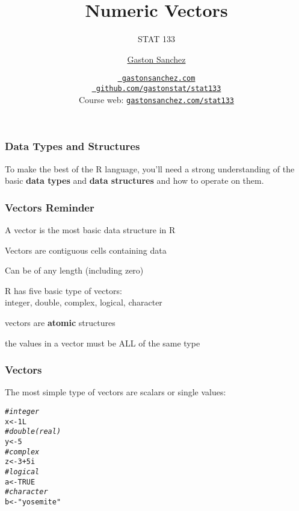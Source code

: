 \documentclass[12pt]{beamer}\usepackage[]{graphicx}\usepackage[]{color}
\title{Numeric Vectors}
\subtitle{STAT 133}
\author{\href{http://www.gastonsanchez.com}{Gaston Sanchez}}
\institute{Department of Statistics, UC{\textendash}Berkeley}
\date{\href{http://www.gastonsanchez.com}{\tt \scriptsize \color{foreground} gastonsanchez.com}
\\[-4pt]
\href{http://github.com/gastonstat/stat133}{\tt \scriptsize \color{foreground} github.com/gastonstat/stat133}
\\[-4pt]
{\scriptsize Course web: \href{http://www.gastonsanchez.com/stat133}{\tt gastonsanchez.com/stat133}}
}
\makeatletter
\newcommand{\hlnum}[1]{\textcolor[rgb]{0.686,0.059,0.569}{#1}}%
\newcommand{\hlstr}[1]{\textcolor[rgb]{0.192,0.494,0.8}{#1}}%
\newcommand{\hlcom}[1]{\textcolor[rgb]{0.678,0.584,0.686}{\textit{#1}}}%
\newcommand{\hlopt}[1]{\textcolor[rgb]{0,0,0}{#1}}%
\newcommand{\hlstd}[1]{\textcolor[rgb]{0.345,0.345,0.345}{#1}}%
\newcommand{\hlkwb}[1]{\textcolor[rgb]{0.69,0.353,0.396}{#1}}%
\newenvironment{kframe}{%
 \def\at@end@of@kframe{}%
 \ifinner\ifhmode%
  \def\at@end@of@kframe{\end{minipage}}%
  \begin{minipage}{\columnwidth}%
 \fi\fi%
 \def\FrameCommand##1{\hskip\@totalleftmargin \hskip-\fboxsep
 \colorbox{shadecolor}{##1}\hskip-\fboxsep
     \hskip-\linewidth \hskip-\@totalleftmargin \hskip\columnwidth}%
 \MakeFramed {\advance\hsize-\width
   \@totalleftmargin\z@ \linewidth\hsize
   \@setminipage}}%
 {\par\unskip\endMakeFramed%
 \at@end@of@kframe}
\newenvironment{knitrout}{}{} %
\makeatother
\begin{document}
{
  \frame{
    \titlepage
  } 
}


\begin{frame}
\frametitle{Data Types and Structures}

To make the best of the R language, you'll need a strong understanding of the basic \textbf{data types} and \textbf{data structures} and how to operate on them.

\end{frame}


\begin{frame}
\begin{center}
\Huge{}
\end{center}
\end{frame}


\begin{frame}
\frametitle{Vectors Reminder}

\bi
  \item A vector is the most basic data structure in R
  \item Vectors are contiguous cells containing data
  \item Can be of any length (including zero)
  \item R has five basic type of vectors: \\
  integer, double, complex, logical, character
  \item vectors are \textbf{atomic} structures
  \item the values in a vector must be ALL of the same type 
\ei

\end{frame}


\begin{frame}[fragile]
\frametitle{Vectors}

The most simple type of vectors are scalars or single values:
\begin{knitrout}\footnotesize
{}\color{fgcolor}\begin{kframe}
\begin{alltt}
\hlcom{# integer}
\hlstd{x} \hlkwb{<-} \hlnum{1L}
\hlcom{# double (real)}
\hlstd{y} \hlkwb{<-} \hlnum{5}
\hlcom{# complex}
\hlstd{z} \hlkwb{<-} \hlnum{3} \hlopt{+} \hlnum{5i}
\hlcom{# logical}
\hlstd{a} \hlkwb{<-} \hlnum{TRUE}
\hlcom{# character}
\hlstd{b} \hlkwb{<-} \hlstr{"yosemite"}
\end{alltt}
\end{kframe}
\end{knitrout}

\end{frame}
\end{document}

